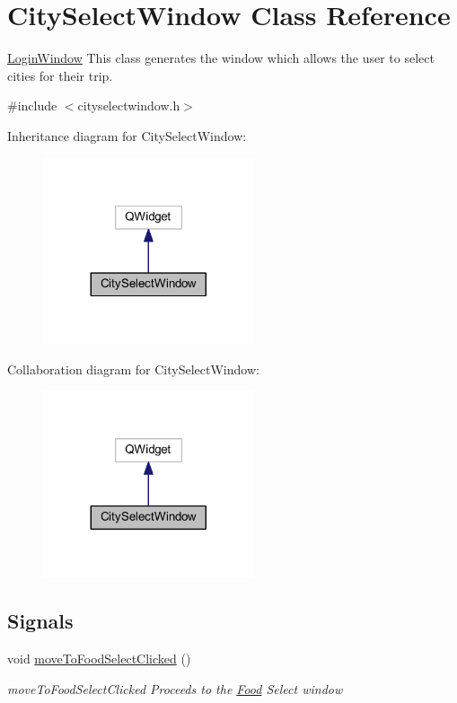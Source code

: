 \hypertarget{class_city_select_window}{}\section{City\+Select\+Window Class Reference}
\label{class_city_select_window}


\mbox{\hyperlink{class_login_window}{Login\+Window}} This class generates the window which allows the user to select cities for their trip.  




{\ttfamily \#include $<$cityselectwindow.\+h$>$}



Inheritance diagram for City\+Select\+Window\+:
\nopagebreak
\begin{figure}[H]
\begin{center}
\leavevmode
\includegraphics[width=176pt]{class_city_select_window__inherit__graph}
\end{center}
\end{figure}


Collaboration diagram for City\+Select\+Window\+:
\nopagebreak
\begin{figure}[H]
\begin{center}
\leavevmode
\includegraphics[width=176pt]{class_city_select_window__coll__graph}
\end{center}
\end{figure}
\subsection*{Signals}
\begin{DoxyCompactItemize}
\item 
void \mbox{\hyperlink{class_city_select_window_a6181200e04334e668f39df57af243fff}{move\+To\+Food\+Select\+Clicked}} ()
\begin{DoxyCompactList}\small\item\em move\+To\+Food\+Select\+Clicked Proceeds to the \mbox{\hyperlink{class_food}{Food}} Select window \end{DoxyCompactList}\end{DoxyCompactItemize}
